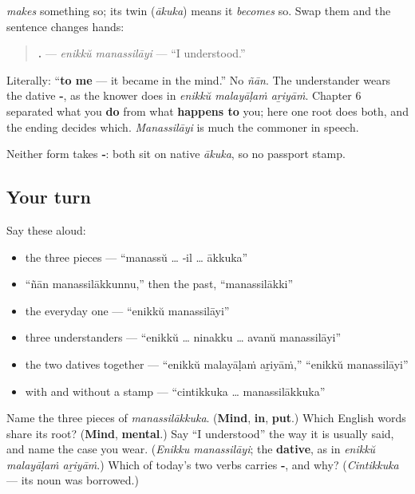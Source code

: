 \begin{grammarlens}[title={Grammar Lens: two verbs, one root, and who does the work}]
\textbf{} \emph{makes} something so; its twin \textbf{} (\emph{ākuka}) means it \emph{becomes} so. Swap them and the sentence changes hands:

\begin{quote}
\textbf{ .} — \emph{enikkŭ manassilāyi} — \textquotedblleft{}I understood.\textquotedblright{}
\end{quote}

Literally: \textquotedblleft{}\textbf{to me} — it became in the mind.\textquotedblright{} No \emph{ñān}. The understander wears the dative \textbf{‑}, as the knower does in \emph{enikkŭ malayāḷaṁ aṟiyāṁ}. Chapter 6 separated what you \textbf{do} from what \textbf{happens to} you; here one root does both, and the ending decides which. \emph{Manassilāyi} is much the commoner in speech.

Neither form takes \textbf{‑}: both sit on native \emph{ākuka}, so no passport stamp.
\end{grammarlens}

\subsection*{Your turn}
Say these aloud:

\begin{itemize}
\raggedright
  \item the three pieces — \textquotedblleft{}manassŭ … ‑il … ākkuka\textquotedblright{}
  \item \textquotedblleft{}ñān manassilākkunnu,\textquotedblright{} then the past, \textquotedblleft{}manassilākki\textquotedblright{}
  \item the everyday one — \textquotedblleft{}enikkŭ manassilāyi\textquotedblright{}
  \item three understanders — \textquotedblleft{}enikkŭ … ninakku … avanŭ manassilāyi\textquotedblright{}
  \item the two datives together — \textquotedblleft{}enikkŭ malayāḷaṁ aṟiyāṁ,\textquotedblright{} \textquotedblleft{}enikkŭ manassilāyi\textquotedblright{}
  \item with and without a stamp — \textquotedblleft{}cintikkuka … manassilākkuka\textquotedblright{}
\end{itemize}

\begin{tcolorbox}[breakable,colback=teal!4,colframe=teal!35!black,title={Before you move on}]
Name the three pieces of \emph{manassilākkuka}. (\textbf{Mind}, \textbf{in}, \textbf{put}.) Which English words share its root? (\textbf{Mind}, \textbf{mental}.) Say \textquotedblleft{}I understood\textquotedblright{} the way it is usually said, and name the case you wear. (\emph{Enikku manassilāyi}; the \textbf{dative}, as in \emph{enikkŭ malayāḷaṁ aṟiyāṁ}.) Which of today's two verbs carries \textbf{‑}, and why? (\emph{Cintikkuka} — its noun was borrowed.)
\end{tcolorbox}
